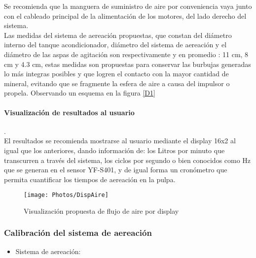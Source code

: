 \documentclass[11pt,letter
								]
								{article}
\begin{document}
	Se  recomienda que la manguera de suministro de aire por conveniencia vaya junto con el cableado principal de la alimentación de los motores, del lado derecho del sistema.\\

	Las medidas del sistema de aereación propuestas, que constan del diámetro interno del tanque acondicionador, diámetro del sistema de aereación y el diámetro de las aspas de agitación son respectivamente y en promedio  : 11 cm, 8 cm y  4.3 cm, estas medidas son propuestas para conservar las burbujas generadas lo más integras posibles y que logren el contacto con la mayor cantidad de mineral, evitando que se fragmente la esfera de aire a causa del impulsor o propela. Observando un esquema en la figura \ref{D1}\\

	





	\paragraph{Visualización de resultados al usuario }.\\

El resultados se recomienda mostrarse   al usuario mediante el display 16x2 al igual que los anteriores, dando información de: los Litros por minuto que transcurren a través del sistema, los ciclos por segundo o bien conocidos como Hz que se generan en el sensor YF-S401, y de igual forma un cronómetro que permita cuantificar los tiempos de aereación en la pulpa.\\




\begin{figure}[H]
\centering
\texttt{[image: Photos/DispAire]}
\caption{Visualización propuesta de flujo de aire por display  }
\label{DispAire}
\end{figure}



	\subsubsection{Calibración del sistema de aereación }

\begin{itemize}
\item Sistema de aereación:
\end{itemize}
\end{document}
